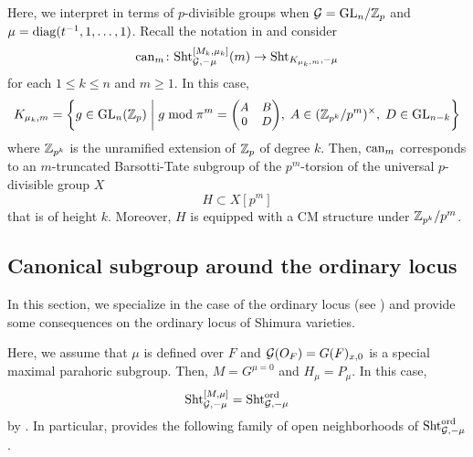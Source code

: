 \documentclass[12pt,reqno]{amsart}
\begin{document}
\begin{exa} \label{exa:interpretation_p_divisible_groups}
    Here, we interpret  in terms of $p$-divisible groups when ${\mathcal{G}} = {\operatorname{GL}}_n / \mathbb{Z}_p$ and $\mu = {\operatorname{diag}}(t^{-1}, 1, \ldots, 1)$. Recall the notation in  and consider
    \[
        {\operatorname{can}}_m \colon {\operatorname{Sht}}_{{\mathcal{G}}, -\mu}^{[M_k, \mu_k]}(m) \to {\operatorname{Sht}}_{K_{\mu_k, m}, -\mu}
    \]
    for each $1 \leq k \leq n$ and $m \geq 1$. In this case, 
    \[
        K_{\mu_k, m} = \left\{ g \in {\operatorname{GL}}_n(\mathbb{Z}_p)  \; \bigg\vert \; g \bmod{\pi^m} = {\small \begin{pmatrix}
            A & B \\
            0 & D
        \end{pmatrix}},\; A \in (\mathbb{Z}_{p^k} / p^m)^\times,\; D \in {\operatorname{GL}}_{n-k}
        \right\}
    \]
    where $\mathbb{Z}_{p^k}$ is the unramified extension of $\mathbb{Z}_p$ of degree $k$. Then, ${\operatorname{can}}_m$ corresponds to an $m$-truncated Barsotti-Tate subgroup of the $p^m$-torsion of the universal $p$-divisible group $X$
    \[
        H \subset X[p^m]
    \]
    that is of height $k$. Moreover, $H$ is equipped with a CM structure under $\mathbb{Z}_{p^k} / p^m$. 
\end{exa}

\subsection{Canonical subgroup around the ordinary locus}

In this section, we specialize  in the case of the ordinary locus (see ) and provide some consequences on the ordinary locus of Shimura varieties. 

Here, we assume that $\mu$ is defined over $F$ and ${\mathcal{G}}(O_F) = G(F)_{x, 0}$ is a special maximal parahoric subgroup. Then, $M = G^{\mu = 0}$ and $H_\mu = P_\mu$. In this case, 
\[
    {\operatorname{Sht}}_{{\mathcal{G}}, -\mu}^{[M, \mu]} = {\operatorname{Sht}}_{{\mathcal{G}}, -\mu}^{\operatorname{ord}}
\]
by . In particular,  provides the following family of open neighborhoods of ${\operatorname{Sht}}_{{\mathcal{G}}, -\mu}^{\operatorname{ord}}$. 
\end{document}
